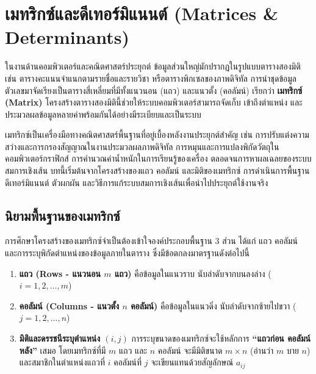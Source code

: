 \chapter{เมทริกซ์และดีเทอร์มิแนนต์ (Matrices \& Determinants)}
\label{ch:matrix}
\label{sec:matrix-intro}

ในงานด้านคอมพิวเตอร์และคณิตศาสตร์ประยุกต์ ข้อมูลส่วนใหญ่มักปรากฏในรูปแบบตารางสองมิติ เช่น ตารางคะแนนจำแนกตามรายชื่อและรายวิชา หรือตารางพิกเซลของภาพดิจิทัล การนำชุดข้อมูลตัวเลขมาจัดเรียงเป็นตารางสี่เหลี่ยมที่มีทั้งแนวนอน (แถว) และแนวตั้ง (คอลัมน์) เรียกว่า \textbf{เมทริกซ์ (Matrix)} โครงสร้างตารางสองมิตินี้ช่วยให้ระบบคอมพิวเตอร์สามารถจัดเก็บ เข้าถึงตำแหน่ง และประมวลผลข้อมูลหลายค่าพร้อมกันได้อย่างมีระเบียบและเป็นระบบ~\parencite{anton2019linear, strang2023linear}

เมทริกซ์เป็นเครื่องมือทางคณิตศาสตร์พื้นฐานที่อยู่เบื้องหลังงานประยุกต์สำคัญ เช่น การปรับแต่งความสว่างและการกรองสัญญาณในงานประมวลผลภาพดิจิทัล การหมุนและการแปลงพิกัดวัตถุในคอมพิวเตอร์กราฟิกส์ การคำนวณค่าน้ำหนักในการเรียนรู้ของเครื่อง ตลอดจนการหาผลเฉลยของระบบสมการเชิงเส้น บทนี้เริ่มต้นจากโครงสร้างของแถว คอลัมน์ และมิติของเมทริกซ์ การดำเนินการพื้นฐาน ดีเทอร์มิแนนต์ ตัวผกผัน และวิธีการแก้ระบบสมการเชิงเส้นเพื่อนำไปประยุกต์ใช้งานจริง

\section{นิยามพื้นฐานของเมทริกซ์}
\label{sec:matrix-definition}

การศึกษาโครงสร้างของเมทริกซ์จำเป็นต้องเข้าใจองค์ประกอบพื้นฐาน 3 ส่วน ได้แก่ แถว คอลัมน์ และการระบุพิกัดตำแหน่งของข้อมูลภายในตาราง ซึ่งมีข้อตกลงมาตรฐานดังต่อไปนี้~\parencite{anton2019linear}

\begin{enumerate}[label=\textbf{\arabic*.}]
    \item \textbf{แถว (Rows - แนวนอน $m$ แถว)} คือข้อมูลในแนวราบ นับลำดับจากบนลงล่าง ($i = 1, 2, \ldots, m$)
    \item \textbf{คอลัมน์ (Columns - แนวตั้ง $n$ คอลัมน์)} คือข้อมูลในแนวดิ่ง นับลำดับจากซ้ายไปขวา ($j = 1, 2, \ldots, n$)
    \item \textbf{มิติและดรรชนีระบุตำแหน่ง $(i, j)$} การระบุขนาดของเมทริกซ์จะใช้หลักการ \textbf{``แถวก่อน คอลัมน์หลัง''} เสมอ โดยเมทริกซ์ที่มี $m$ แถว และ $n$ คอลัมน์ จะมีมิติขนาด $m \times n$ (อ่านว่า $m$ บาย $n$) และสมาชิกในตำแหน่งแถวที่ $i$ คอลัมน์ที่ $j$ จะเขียนแทนด้วยสัญลักษณ์ $a_{ij}$
\end{enumerate}

